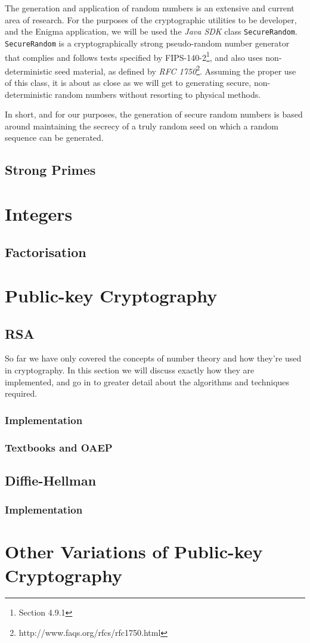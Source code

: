     The generation and application of random numbers is an extensive and current area of research. For the purposes of the cryptographic utilities to be developer, and the Enigma application, we will be used the \emph{Java SDK} class \verb!SecureRandom!. \verb!SecureRandom! is a cryptographically strong pseudo-random number generator that complies and follows tests specified by FIPS-140-2\footnote{Section 4.9.1}, and also uses non-deterministic seed material, as defined by \emph{RFC 1750}\footnote{http://www.faqs.org/rfcs/rfc1750.html}. Assuming the proper use of this class, it is about as close as we will get to generating secure, non-deterministic random numbers without resorting to physical methods.
    
    In short, and for our purposes, the generation of secure random numbers is based around maintaining the secrecy of a truly random seed on which a random sequence can be generated.
    
  \subsection{Strong Primes}

\section{Integers}

  \subsection{Factorisation}

\section{Public-key Cryptography}

  \subsection{RSA}
  
  So far we have only covered the concepts of number theory and how they're used in cryptography. In this section we will discuss exactly how they are implemented, and go in to greater detail about the algorithms and techniques required.
  
    \subsubsection{Implementation}
    
    \subsubsection{Textbooks and OAEP}

  \subsection{Diffie-Hellman}
  
    \subsubsection{Implementation}
  
\section{Other Variations of Public-key Cryptography}